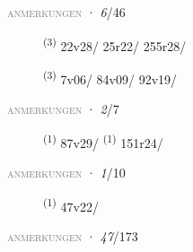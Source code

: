\textsc{\textcolor{gray}{anmerkungen}}
\ENTRYEND
\noindent{} · \textit{6}/46 \LEMMALINE
\begin{description}
    \item[]  \textsuperscript{(3)} \mbox{22v28/} \mbox{25r22/} \mbox{255r28/}
    \item[]  \textsuperscript{(3)} \mbox{7v06/} \mbox{84v09/} \mbox{92v19/}
\end{description}
\textsc{\textcolor{gray}{anmerkungen}}
\ENTRYEND
\noindent{} · \textit{2}/7 \LEMMALINE
\begin{description}
    \item[]  \textsuperscript{(1)} \mbox{87v29/} \CASEBREAK {} \textsuperscript{(1)} \mbox{151r24/}
\end{description}
\textsc{\textcolor{gray}{anmerkungen}}
\ENTRYEND
\noindent{} · \textit{1}/10 \LEMMALINE
\begin{description}
    \item[]  \textsuperscript{(1)} \mbox{47v22/}
\end{description}
\textsc{\textcolor{gray}{anmerkungen}}
\ENTRYEND
\noindent{} · \textit{47}/173 \LEMMALINE
